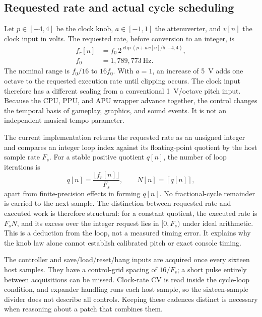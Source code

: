 \documentclass[10pt,letterpaper,twocolumn]{article}
\newcommand{\clip}{\operatorname{clip}}
\newcommand{\ceil}[1]{\left\lceil #1\right\rceil}
\begin{document}
\subsection{Requested rate and actual cycle scheduling}
Let $p\in[-4,4]$ be the clock knob, $a\in[-1,1]$ the attenuverter, and $v[n]$
the clock input in volts. The requested rate, before conversion to an integer,
is
\begin{equation}
 \begin{aligned}
 f_r[n]&=f_0\,2^{\clip(p+a\,v[n]/5,-4,4)},\\
 f_0&=1{,}789{,}773\ \mathrm{Hz}.
 \end{aligned}
 \label{eq:rate}
\end{equation}
The nominal range is $f_0/16$ to $16f_0$. With $a=1$, an increase of 5~V
adds one octave to the requested execution rate until clipping occurs. The
clock input therefore has a different scaling from a conventional 1~V/octave
pitch input. Because the CPU, PPU, and APU wrapper advance together, the
control changes the temporal basis of gameplay, graphics, and sound events.
It is not an independent musical-tempo parameter.

The current implementation returns the requested rate as an unsigned integer
and compares an integer loop index against its floating-point quotient by the
host sample rate $F_s$. For a stable positive quotient $q[n]$, the number of
loop iterations is
\begin{equation}
 q[n]=\frac{\lfloor f_r[n]\rfloor}{F_s},
 \qquad N[n]=\ceil{q[n]},
 \label{eq:cycles}
\end{equation}
apart from finite-precision effects in forming $q[n]$. No fractional-cycle
remainder is carried to the next sample. The distinction between requested
rate and executed work is therefore structural: for a constant quotient,
the executed rate is $F_sN$, and its excess over the integer request lies in
$[0,F_s)$ under ideal arithmetic. This is a deduction from the loop, not a
measured timing error. It explains why the knob law alone cannot establish
calibrated pitch or exact console timing.

The controller and save/load/reset/hang inputs are acquired once every sixteen
host samples. They have a control-grid spacing of $16/F_s$; a short pulse
entirely between acquisitions can be missed. Clock-rate CV is read inside the
cycle-loop condition, and expander handling runs each host sample, so the
sixteen-sample divider does not describe all controls. Keeping these cadences
distinct is necessary when reasoning about a patch that combines them.
\end{document}
